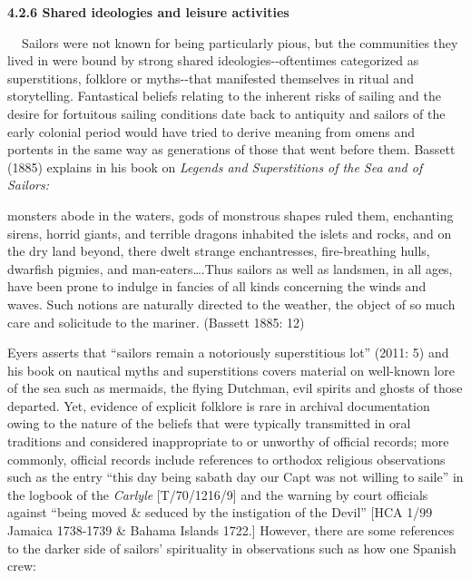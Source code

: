 \begin{styleStandard}
\textbf{4.2.6 Shared ideologies and leisure activities}
\end{styleStandard}

\begin{styleStandard}
\textbf{\ \ }Sailors were not known for being particularly pious, but the communities they lived in were bound by strong shared ideologies-{}-oftentimes categorized as superstitions, folklore or myths-{}-that manifested themselves in ritual and storytelling. Fantastical beliefs relating to the inherent risks of sailing and the desire for fortuitous sailing conditions date back to antiquity and sailors of the early colonial period would have tried to derive meaning from omens and portents in the same way as generations of those that went before them. Bassett (1885) explains in his book on \textit{Legends and Superstitions of the Sea and of Sailors:}
\end{styleStandard}

\begin{styleStandard}
monsters abode in the waters, gods of monstrous shapes ruled them, enchanting sirens, horrid giants, and terrible dragons inhabited the islets and rocks, and on the dry land beyond, there dwelt strange enchantresses, fire-breathing hulls, dwarfish pigmies, and man-eaters….Thus sailors as well as landsmen, in all ages, have been prone to indulge in fancies of all kinds concerning the winds and waves. Such notions are naturally directed to the weather, the object of so much care and solicitude to the mariner. (Bassett 1885: 12)
\end{styleStandard}

\begin{styleStandard}
Eyers asserts that “sailors remain a notoriously superstitious lot” (2011: 5) and his book on nautical myths and superstitions covers material on well-known lore of the sea such as mermaids, the flying Dutchman, evil spirits and ghosts of those departed. Yet, evidence of explicit folklore is rare in archival documentation owing to the nature of the beliefs that were typically transmitted in oral traditions and considered inappropriate to or unworthy of official records; more commonly, official records include references to orthodox religious observations such as the entry “this day being sabath day our Capt was not willing to saile” in the logbook of the \textit{Carlyle} [T/70/1216/9] and the warning by court officials against “being moved \& seduced by the instigation of the Devil” [HCA 1/99 Jamaica 1738-1739 \& Bahama Islands 1722.] However, there are some references to the darker side of sailors’ spirituality in observations such as how one Spanish crew: 
\end{styleStandard}

